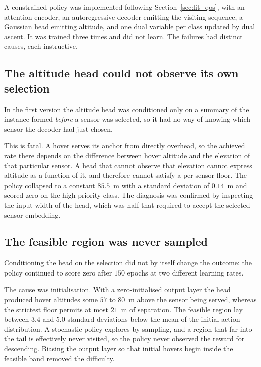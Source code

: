 A constrained policy was implemented following Section~\ref{sec:lit_qos}, with an attention encoder, an autoregressive decoder emitting the visiting sequence, a Gaussian head emitting altitude, and one dual variable per class updated by dual ascent. It was trained three times and did not learn. The failures had distinct causes, each instructive.

\subsection{The altitude head could not observe its own selection}

In the first version the altitude head was conditioned only on a summary of the instance formed \emph{before} a sensor was selected, so it had no way of knowing which sensor the decoder had just chosen.

This is fatal. A hover serves its anchor from directly overhead, so the achieved rate there depends on the difference between hover altitude and the elevation of that particular sensor. A head that cannot observe that elevation cannot express altitude as a function of it, and therefore cannot satisfy a per-sensor floor. The policy collapsed to a constant $85.5$~m with a standard deviation of $0.14$~m and scored zero on the high-priority class. The diagnosis was confirmed by inspecting the input width of the head, which was half that required to accept the selected sensor embedding.

\subsection{The feasible region was never sampled}

Conditioning the head on the selection did not by itself change the outcome: the policy continued to score zero after $150$ epochs at two different learning rates.

The cause was initialisation. With a zero-initialised output layer the head produced hover altitudes some $57$ to $80$~m above the sensor being served, whereas the strictest floor permits at most $21$~m of separation. The feasible region lay between $3.4$ and $5.0$ standard deviations below the mean of the initial action distribution. A stochastic policy explores by sampling, and a region that far into the tail is effectively never visited, so the policy never observed the reward for descending. Biasing the output layer so that initial hovers begin inside the feasible band removed the difficulty.

